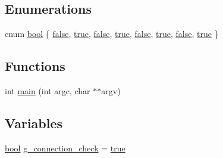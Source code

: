 \subsection*{Enumerations}
\begin{DoxyCompactItemize}
\item 
enum \mbox{\hyperlink{tcpserver_2l2cap-client_8c_af6a258d8f3ee5206d682d799316314b1}{bool}} \{ \newline
\mbox{\hyperlink{piconet_2l2cap-client_8c_af6a258d8f3ee5206d682d799316314b1ae9de385ef6fe9bf3360d1038396b884c}{false}}, 
\mbox{\hyperlink{piconet_2l2cap-client_8c_af6a258d8f3ee5206d682d799316314b1a08f175a5505a10b9ed657defeb050e4b}{true}}, 
\mbox{\hyperlink{piconet_2l2cap-server_8c_af6a258d8f3ee5206d682d799316314b1ae9de385ef6fe9bf3360d1038396b884c}{false}}, 
\mbox{\hyperlink{piconet_2l2cap-server_8c_af6a258d8f3ee5206d682d799316314b1a08f175a5505a10b9ed657defeb050e4b}{true}}, 
\newline
\mbox{\hyperlink{connection__handler_8c_af6a258d8f3ee5206d682d799316314b1ae9de385ef6fe9bf3360d1038396b884c}{false}}, 
\mbox{\hyperlink{connection__handler_8c_af6a258d8f3ee5206d682d799316314b1a08f175a5505a10b9ed657defeb050e4b}{true}}, 
\mbox{\hyperlink{tcpserver_2l2cap-client_8c_af6a258d8f3ee5206d682d799316314b1ae9de385ef6fe9bf3360d1038396b884c}{false}}, 
\mbox{\hyperlink{tcpserver_2l2cap-client_8c_af6a258d8f3ee5206d682d799316314b1a08f175a5505a10b9ed657defeb050e4b}{true}}
 \}
\end{DoxyCompactItemize}
\subsection*{Functions}
\begin{DoxyCompactItemize}
\item 
int \mbox{\hyperlink{tcpserver_2l2cap-client_8c_a3c04138a5bfe5d72780bb7e82a18e627}{main}} (int argc, char $\ast$$\ast$argv)
\end{DoxyCompactItemize}
\subsection*{Variables}
\begin{DoxyCompactItemize}
\item 
\mbox{\hyperlink{piconet_2l2cap-client_8c_af6a258d8f3ee5206d682d799316314b1}{bool}} \mbox{\hyperlink{tcpserver_2l2cap-client_8c_a81bc6941c354c1be6ad9931b4f2b50bf}{g\+\_\+connection\+\_\+check}} = \mbox{\hyperlink{tcpserver_2l2cap-client_8c_af6a258d8f3ee5206d682d799316314b1a08f175a5505a10b9ed657defeb050e4b}{true}}
\end{DoxyCompactItemize}


